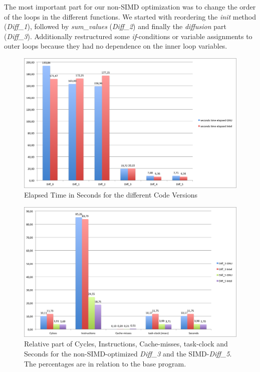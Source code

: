 \documentclass[12pt,a4paper]{article}
\begin{document}
The most important part for our non-SIMD optimization was to change the order of the loops in the different functions. We started with reordering the \emph{init} method (\emph{Diff\_1}), followed by \emph{sum\_values} (\emph{Diff\_2}) and finally the \emph{diffusion} part (\emph{Diff\_3}). Additionally restructured some \emph{if}-conditions or variable assignments to outer loops because they had no dependence on the inner loop variables.  

 
\begin{figure}
	\centering
	\includegraphics[width=1.0\linewidth]{"Benchmark/seconds"}
	\caption{Elapsed Time in Seconds for the different Code Versions}
	\label{fig:seconds}
\end{figure}

\begin{figure}
	\centering
	\includegraphics[width=1.0\linewidth]{"Benchmark/percentage"}
	\caption{Relative part of Cycles, Instructions, Cache-misses, task-clock and Seconds for the non-SIMD-optimized \emph{Diff\_3} and the SIMD-\emph{Diff\_5}. The percentages are in relation to the base program.}
	\label{fig:percentage}
\end{figure}
\end{document}
